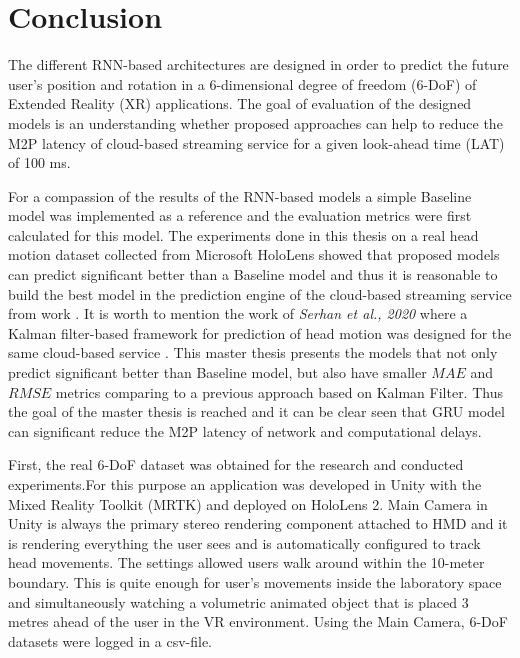 \chapter{Conclusion}
\label{sec:conclusion}
The different RNN-based architectures are designed in order to predict the future user's position and rotation in a 6-dimensional degree of freedom (6-DoF) of Extended Reality (XR) applications. The goal of evaluation of the designed models is an understanding whether proposed approaches can help to reduce the M2P latency of cloud-based streaming service for a given look-ahead time (LAT) of 100 ms. 

For a compassion of the results of the RNN-based models a simple Baseline model was implemented as a reference and the evaluation metrics were first calculated for this model. The experiments done in this thesis on a real head motion dataset collected from Microsoft HoloLens showed that proposed models can predict significant better than a Baseline model and thus it is reasonable to build the best model in the prediction engine of the cloud-based streaming service from work \cite{serhan_cloud_streaming}. It is worth to mention the work of \textit{Serhan et al., 2020} where a Kalman filter-based framework for prediction of head motion was designed for the same cloud-based service \cite{serhan_kalman}. This master thesis presents the models that not only predict significant better than Baseline model, but also have smaller $MAE$ and $RMSE$ metrics comparing to a previous approach based on Kalman Filter. Thus the goal of the master thesis is reached and it can be clear seen that GRU model can significant reduce the M2P latency of network and computational delays.  

First, the real 6-DoF dataset was obtained for the research and conducted experiments.For this purpose an application was developed in Unity with the Mixed Reality Toolkit (MRTK) and deployed on HoloLens 2. Main Camera in Unity is always the primary stereo rendering component attached to HMD and it is rendering everything the user sees and is automatically configured to track head movements. The settings allowed users walk around within the 10-meter boundary. This is quite enough for user’s movements inside the laboratory space and simultaneously watching a volumetric animated object that is placed 3 metres ahead of the user in the VR environment. Using the Main Camera, 6-DoF datasets were logged in a csv-file.

